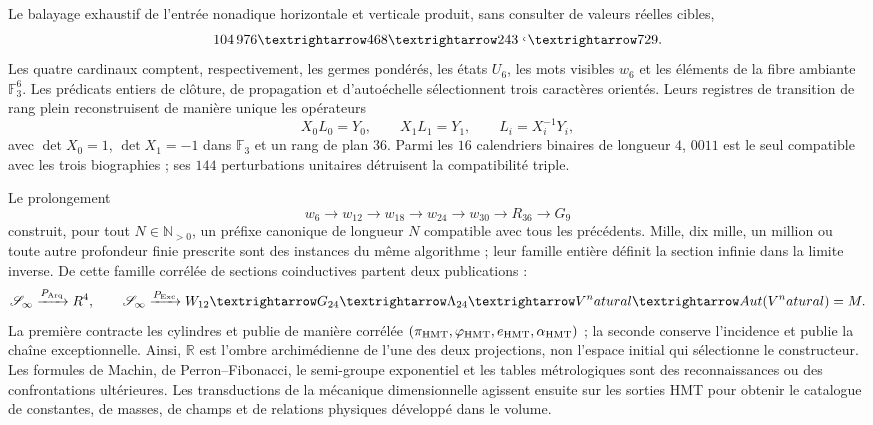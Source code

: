 \begin{theorem}
\label{thm:front-tesis-generativa-doble-proyeccion-2084}
Le balayage exhaustif de l'entrée nonadique horizontale et verticale produit,
sans consulter de valeurs réelles cibles,
\[
 104\,976\longrightarrow468\longrightarrow243
 \lhook\joinrel\longrightarrow729.
\]
Les quatre cardinaux comptent, respectivement, les germes pondérés, les états
\(U_6\), les mots visibles \(w_6\) et les éléments de la fibre ambiante
\(\mathbb F_3^6\). Les prédicats entiers de clôture, de propagation et
d'autoéchelle sélectionnent trois caractères orientés. Leurs registres de
transition de rang plein reconstruisent de manière unique les opérateurs
\[
 X_0L_0=Y_0,
 \qquad X_1L_1=Y_1,
 \qquad
 L_i=X_i^{-1}Y_i,
\]
avec \(\det X_0=1\), \(\det X_1=-1\) dans \(\mathbb F_3\) et un rang de
plan \(36\). Parmi les \(16\) calendriers binaires de longueur \(4\),
\(0011\) est le seul compatible avec les trois biographies ; ses \(144\)
perturbations unitaires détruisent la compatibilité triple.

Le prolongement
\[
 w_6\longrightarrow w_{12}\longrightarrow w_{18}\longrightarrow w_{24}
 \longrightarrow w_{30}\longrightarrow R_{36}\longrightarrow G_9
\]
construit, pour tout \(N\in\mathbb N_{>0}\), un préfixe canonique de
longueur \(N\) compatible avec tous les précédents. Mille, dix mille, un million
ou toute autre profondeur finie prescrite sont des instances du même
algorithme ; leur famille entière définit la section infinie dans la limite
inverse. De cette famille corrélée de sections coinductives partent
deux publications :
\[
 \mathscr S_\infty\xrightarrow{\mathcal P_{\rm Arq}}\mathbb R^4,
 \qquad
 \mathscr S_\infty\xrightarrow{\mathcal P_{\rm Exc}}
 W_{12}\to G_{24}\to\Lambda_{24}\to V^\natural
 \to\operatorname{Aut}(V^\natural)=\mathbb M.
\]
La première contracte les cylindres et publie de manière corrélée
\((\pi_{\rm HMT},\varphi_{\rm HMT},e_{\rm HMT},\alpha_{\rm HMT})\) ; la
seconde conserve l'incidence et publie la chaîne exceptionnelle. Ainsi,
\(\mathbb R\) est l'ombre archimédienne de l'une des deux projections, non
l'espace initial qui sélectionne le constructeur. Les formules de Machin,
de Perron--Fibonacci, le semi-groupe exponentiel et les tables métrologiques sont
des reconnaissances ou des confrontations ultérieures. Les transductions de la mécanique
dimensionnelle agissent ensuite sur les sorties HMT pour obtenir le catalogue de
constantes, de masses, de champs et de relations physiques développé dans le volume.
\end{theorem}

